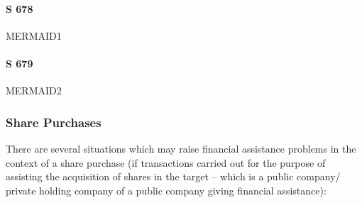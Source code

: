 \documentclass[
]{article}
\begin{document}
\hypertarget{s-678}{%
\paragraph{S 678}\label{s-678}}

MERMAID1

\hypertarget{s-679}{%
\paragraph{S 679}\label{s-679}}

MERMAID2

\hypertarget{share-purchases}{%
\subsubsection{Share Purchases}\label{share-purchases}}

There are several situations which may raise financial assistance
problems in the context of a share purchase (if transactions carried out
for the purpose of assisting the acquisition of shares in the target --
which is a public company/ private holding company of a public company
giving financial assistance):
\end{document}

